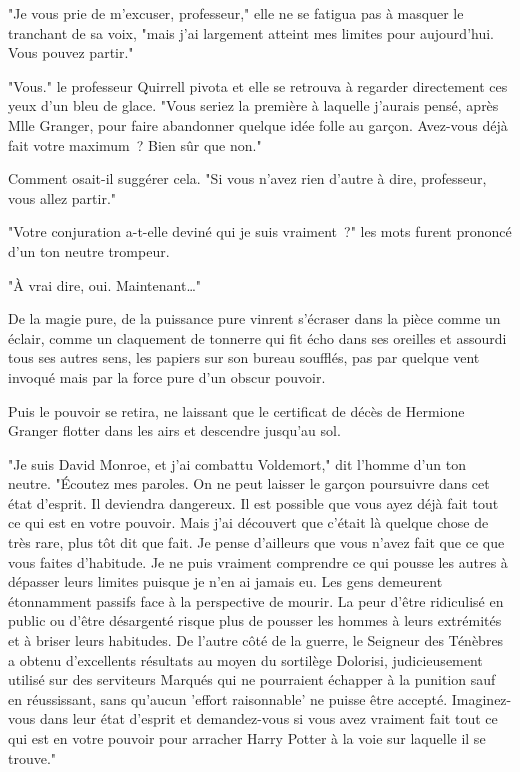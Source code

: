 "Je vous prie de m'excuser, professeur," elle ne se fatigua pas à masquer le tranchant de sa voix, "mais j'ai largement atteint mes limites pour aujourd'hui. Vous pouvez partir."

"Vous." le professeur Quirrell pivota et elle se retrouva à regarder directement ces yeux d'un bleu de glace. "Vous seriez la première à laquelle j'aurais pensé, après Mlle Granger, pour faire abandonner quelque idée folle au garçon. Avez-vous déjà fait votre maximum~? Bien sûr que non."

Comment osait-il suggérer cela. "Si vous n'avez rien d'autre à dire, professeur, vous allez partir."

"Votre conjuration a-t-elle deviné qui je suis vraiment~?" les mots furent prononcé d'un ton neutre trompeur.

"À vrai dire, oui. Maintenant…"

De la magie pure, de la puissance pure vinrent s'écraser dans la pièce comme un éclair, comme un claquement de tonnerre qui fit écho dans ses oreilles et assourdi tous ses autres sens, les papiers sur son bureau soufflés, pas par quelque vent invoqué mais par la force pure d'un obscur pouvoir.

Puis le pouvoir se retira, ne laissant que le certificat de décès de Hermione Granger flotter dans les airs et descendre jusqu'au sol.

"Je suis David Monroe, et j'ai combattu Voldemort," dit l'homme d'un ton neutre. "Écoutez mes paroles. On ne peut laisser le garçon poursuivre dans cet état d'esprit. Il deviendra dangereux. Il est possible que vous ayez déjà fait tout ce qui est en votre pouvoir. Mais j'ai découvert que c'était là quelque chose de très rare, plus tôt dit que fait. Je pense d'ailleurs que vous n'avez fait que ce que vous faites d'habitude. Je ne puis vraiment comprendre ce qui pousse les autres à dépasser leurs limites puisque je n'en ai jamais eu. Les gens demeurent étonnamment passifs face à la perspective de mourir. La peur d'être ridiculisé en public ou d'être désargenté risque plus de pousser les hommes à leurs extrémités et à briser leurs habitudes. De l'autre côté de la guerre, le Seigneur des Ténèbres a obtenu d'excellents résultats au moyen du sortilège Dolorisi, judicieusement utilisé sur des serviteurs Marqués qui ne pourraient échapper à la punition sauf en réussissant, sans qu'aucun 'effort raisonnable' ne puisse être accepté. Imaginez-vous dans leur état d'esprit et demandez-vous si vous avez vraiment fait tout ce qui est en votre pouvoir pour arracher Harry Potter à la voie sur laquelle il se trouve."

